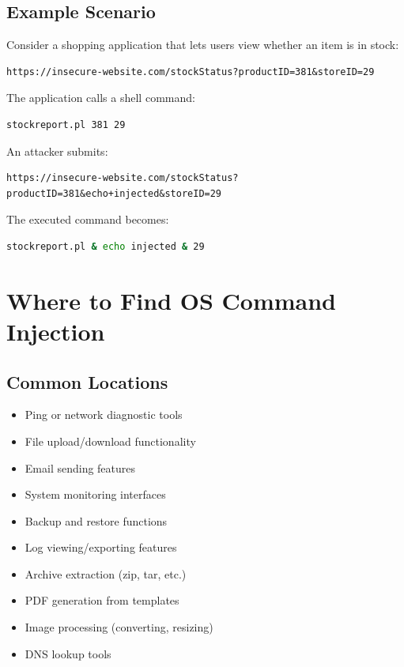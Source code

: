 \documentclass[12pt]{article}
\begin{document}
\subsection{Example Scenario}

Consider a shopping application that lets users view whether an item is in stock:

\begin{lstlisting}
https://insecure-website.com/stockStatus?productID=381&storeID=29
\end{lstlisting}

The application calls a shell command:
\begin{lstlisting}[language=bash]
stockreport.pl 381 29
\end{lstlisting}

An attacker submits:
\begin{lstlisting}
https://insecure-website.com/stockStatus?productID=381&echo+injected&storeID=29
\end{lstlisting}

The executed command becomes:
\begin{lstlisting}[language=bash]
stockreport.pl & echo injected & 29
\end{lstlisting}

\section{Where to Find OS Command Injection}

\subsection{Common Locations}

\begin{itemize}
    \item Ping or network diagnostic tools
    \item File upload/download functionality
    \item Email sending features
    \item System monitoring interfaces
    \item Backup and restore functions
    \item Log viewing/exporting features
    \item Archive extraction (zip, tar, etc.)
    \item PDF generation from templates
    \item Image processing (converting, resizing)
    \item DNS lookup tools
\end{itemize}
\end{document}
